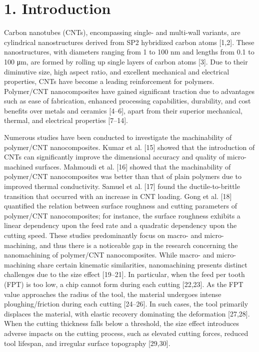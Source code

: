 \documentclass{article}
\begin{document}
\section*{1. Introduction}

Carbon nanotubes (CNTs), encompassing single- and multi-wall variants, are cylindrical nanostructures derived from SP2 hybridized carbon atoms [1,2]. These nanostructures, with diameters ranging from 1 to 100 nm and lengths from 0.1 to 100 μm, are formed by rolling up single layers of carbon atoms [3]. Due to their diminutive size, high aspect ratio, and excellent mechanical and electrical properties, CNTs have become a leading reinforcement for polymers. Polymer/CNT nanocomposites have gained significant traction due to advantages such as ease of fabrication, enhanced processing capabilities, durability, and cost benefits over metals and ceramics [4–6], apart from their superior mechanical, thermal, and electrical properties [7–14].

Numerous studies have been conducted to investigate the machinability of polymer/CNT nanocomposites. Kumar et al. [15] showed that the introduction of CNTs can significantly improve the dimensional accuracy and quality of micro-machined surfaces. Mahmoudi et al. [16] showed that the machinability of polymer/CNT nanocomposites was better than that of plain polymers due to improved thermal conductivity. Samuel et al. [17] found the ductile-to-brittle transition that occurred with an increase in CNT loading. Gong et al. [18] quantified the relation between surface roughness and cutting parameters of polymer/CNT nanocomposites; for instance, the surface roughness exhibits a linear dependency upon the feed rate and a quadratic dependency upon the cutting speed. These studies predominantly focus on macro- and micro-machining, and thus there is a noticeable gap in the research concerning the nanomachining of polymer/CNT nanocomposites. While macro- and micro-machining share certain kinematic similarities, nanomachining presents distinct challenges due to the size effect [19–21]. In particular, when the feed per tooth (FPT) is too low, a chip cannot form during each cutting [22,23]. As the FPT value approaches the radius of the tool, the material undergoes intense ploughing/friction during each cutting [24–26]. In such cases, the tool primarily displaces the material, with elastic recovery dominating the deformation [27,28]. When the cutting thickness falls below a threshold, the size effect introduces adverse impacts on the cutting process, such as elevated cutting forces, reduced tool lifespan, and irregular surface topography [29,30].
\end{document}
